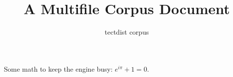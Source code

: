 \documentclass{article}
\title{A Multifile Corpus Document}
\author{tectdist corpus}
\begin{document}
\maketitle


Some math to keep the engine busy: $e^{i\pi}+1=0$.
\end{document}
